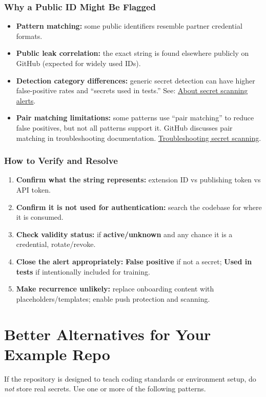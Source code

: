 \documentclass[11pt]{article}
\newcommand{\term}[1]{\textbf{#1}}
\begin{document}
\subsubsection{Why a Public ID Might Be Flagged}
\begin{itemize}
  \item \textbf{Pattern matching:} some public identifiers resemble partner credential formats.
  \item \textbf{Public leak correlation:} the exact string is found elsewhere publicly on GitHub (expected for widely used IDs).
  \item \textbf{Detection category differences:} generic secret detection can have higher false-positive rates and ``secrets used in tests.'' See: \href{https://docs.github.com/en/code-security/concepts/secret-security/about-alerts}{About secret scanning alerts}.
  \item \textbf{Pair matching limitations:} some patterns use ``pair matching'' to reduce false positives, but not all patterns support it. GitHub discusses pair matching in troubleshooting documentation. \href{https://docs.github.com/en/code-security/secret-scanning/troubleshooting-secret-scanning-and-push-protection/troubleshooting-secret-scanning}{Troubleshooting secret scanning}.
\end{itemize}

\subsubsection{How to Verify and Resolve}
\begin{enumerate}
  \item \textbf{Confirm what the string represents:} extension ID vs publishing token vs API token.
  \item \textbf{Confirm it is not used for authentication:} search the codebase for where it is consumed.
  \item \textbf{Check validity status:} if \term{active/unknown} and any chance it is a credential, rotate/revoke.
  \item \textbf{Close the alert appropriately:} \term{False positive} if not a secret; \term{Used in tests} if intentionally included for training.
  \item \textbf{Make recurrence unlikely:} replace onboarding content with placeholders/templates; enable push protection and scanning.
\end{enumerate}

\section{Better Alternatives for Your Example Repo}
If the repository is designed to teach coding standards or environment setup, do \emph{not} store real secrets. Use one or more of the following patterns.
\end{document}
